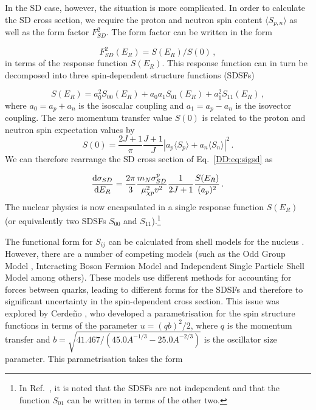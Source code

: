 
In the SD case, however, the situation is more complicated. In order to calculate the SD cross section, we require the proton and neutron spin content $\langle S_{p,n} \rangle$ as well as the form factor $F_{SD}^2$. The form factor can be written in the form

\begin{equation}
F_{SD}^2(E_R) = S(E_R)/S(0)\,,
\end{equation}
in terms of the response function $S(E_R)$. This response function can in turn be decomposed into three spin-dependent structure functions (SDSFs)

\begin{equation}
S(E_R) = a_0^2S_{00}(E_R) + a_0a_1S_{01}(E_R) + a_1^2S_{11}(E_R)\,,
\end{equation}
where $a_0 = a_p + a_n$ is the isoscalar coupling and $a_1 = a_p - a_n$ is the isovector coupling. The zero momentum transfer value $S(0)$ is related to the proton and neutron spin expectation values by \cite{Cannoni:2013}
\begin{equation}
S(0) = \frac{2J + 1}{\pi} \frac{J+1}{J} \left|a_p\langle S_p \rangle + a_n \langle S_n \rangle\right|^2\,.
\end{equation}
We can therefore rearrange the SD cross section of Eq.~\ref{DD:eq:sigsd} as

\begin{equation}
\frac{\mathrm{d}\sigma_{SD}}{\mathrm{d}E_R} = \frac{2\pi}{3} \frac{m_N \sigma_{SD}^p}{\mu_{\chi p}^2 v^2} \frac{1}{2J+1} \frac{S(E_R)}{(a_p)^2}\,.
\end{equation}
The nuclear physics is now encapsulated in a single response function $S(E_R)$ (or equivalently two SDSFs $S_{00}$ and $S_{11}$).\footnote{In Ref.~\cite{Cannoni:2013}, it is noted that the SDSFs are not independent and that the function $S_{01}$ can be written in terms of the other two.}

The functional form for $S_{ij}$ can be calculated from shell models for the nucleus \cite{Ressell:1997}. However, there are a number of competing models (such as the Odd Group Model \cite{Engel:1989}, Interacting Boson Fermion Model \cite{Iachello:1991} and Independent Single Particle Shell Model \cite{Ellis:1988} among others). These models use different methods for accounting for forces between quarks, leading to different forms for the SDSFs and therefore to significant uncertainty in the spin-dependent cross section. This issue was explored by Cerde\~{n}o \etal \cite{Cerdeno:2012}, who developed a parametrisation for the spin structure functions in terms of the parameter $u = (qb)^2/2$, where $q$ is the momentum transfer and $b = \sqrt{41.467/(45.0 A^{-1/3} - 25.0 A^{-2/3})}$ is the oscillator size parameter. This parametrisation takes the form

